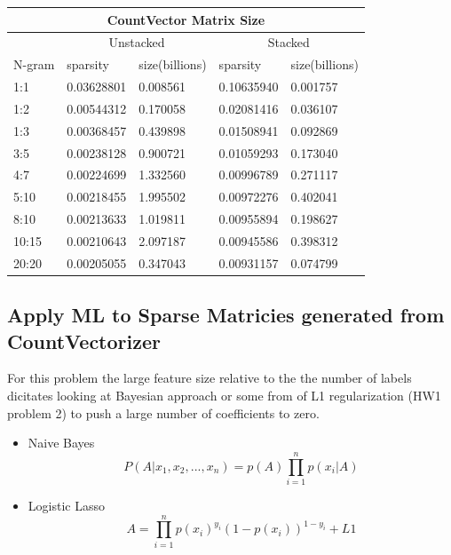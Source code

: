 \documentclass[11pt]{article}
\begin{document}
{\noindent \begin{tabular}{ |p{2cm}||p{2cm}|p{2cm}|p{2cm}|p{2cm}|  }
 \hline
 \multicolumn{5}{|c|}{CountVector Matrix Size} \\
 \hline
 \multicolumn{1}{|c|}{} &
 \multicolumn{2}{|c|}{Unstacked} &
 \multicolumn{2}{|c|}{Stacked}\\
 \hline
 N-gram & sparsity & size(billions) & sparsity & size(billions)\\
 \hline
       1:1& 0.03628801& 0.008561&  0.10635940&   0.001757 \\
       1:2& 0.00544312& 0.170058&  0.02081416&    0.036107\\
       1:3& 0.00368457& 0.439898&  0.01508941&     0.092869\\
       3:5& 0.00238128& 0.900721&  0.01059293&     0.173040\\
       4:7& 0.00224699& 1.332560&  0.00996789&     0.271117\\
      5:10& 0.00218455& 1.995502&  0.00972276&     0.402041\\
      8:10& 0.00213633& 1.019811&  0.00955894&     0.198627\\
     10:15& 0.00210643& 2.097187&  0.00945586&     0.398312\\
     20:20& 0.00205055& 0.347043&  0.00931157&     0.074799\\
 \hline
\end{tabular}

\subsection{Apply ML to Sparse Matricies generated from CountVectorizer}
\noindent
For this problem the large feature size relative to the the number of labels dicitates looking
at Bayesian approach or some from of L1 regularization (HW1 problem 2) to push a large number
of coefficients to zero.
\begin{itemize}
\item Naive Bayes
\begin{equation*}
P(A|x_1,x_2,...,x_n) = p(A)\prod_{i=1}^n p(x_i|A)
\end{equation*}

\item Logistic Lasso
\begin{equation*}
A = \prod_{i=1}^n p(x_i)^{y_i}(1-p(x_i))^{1-y_i}+ L1
\end{equation*}
\end{itemize}

}
\end{document}
